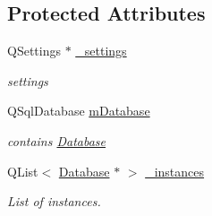 \subsection*{Protected Attributes}
\begin{DoxyCompactItemize}
\item 
\hypertarget{classDatabase_1_1Database_a2b8055481c0231dab258d0446781a94d}{Q\+Settings $\ast$ \hyperlink{classDatabase_1_1Database_a2b8055481c0231dab258d0446781a94d}{\+\_\+settings}}\label{classDatabase_1_1Database_a2b8055481c0231dab258d0446781a94d}

\begin{DoxyCompactList}\small\item\em settings \end{DoxyCompactList}\item 
\hypertarget{classDatabase_1_1Database_a6c63e366e01da448bc43c8a463c6eabd}{Q\+Sql\+Database \hyperlink{classDatabase_1_1Database_a6c63e366e01da448bc43c8a463c6eabd}{m\+Database}}\label{classDatabase_1_1Database_a6c63e366e01da448bc43c8a463c6eabd}

\begin{DoxyCompactList}\small\item\em contains \hyperlink{classDatabase_1_1Database}{Database} \end{DoxyCompactList}\item 
\hypertarget{classDatabase_1_1Database_ac57a668c068a49b734c0407235848f54}{Q\+List$<$ \hyperlink{classDatabase_1_1Database}{Database} $\ast$ $>$ \hyperlink{classDatabase_1_1Database_ac57a668c068a49b734c0407235848f54}{\+\_\+instances}}\label{classDatabase_1_1Database_ac57a668c068a49b734c0407235848f54}

\begin{DoxyCompactList}\small\item\em List of instances. \end{DoxyCompactList}\end{DoxyCompactItemize}
